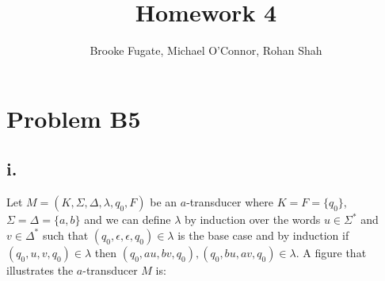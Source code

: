 \documentclass[12pt]{article}
\begin{document}
\pagestyle{plain}
\titleformat{\subsection}[runin]
  {\normalfont\large\bfseries}{\thesubsection}{1em}{}

\title{Homework 4}
\author{Brooke Fugate, Michael O'Connor, Rohan Shah}
\date{}

\maketitle

\section*{Problem B5}
\subsection*{i.}
Let $M = (K, \Sigma, \Delta, \lambda, q_0, F)$ be an $a$-transducer where
$K = F = \{q_0\}$, $\Sigma = \Delta = \{a,b\}$ and we can define $\lambda$
by induction over the words $u\in \Sigma^*$ and $v \in \Delta^*$ such that
$(q_0, \epsilon, \epsilon, q_0) \in \lambda$ is the base case and by induction
if $(q_0, u, v, q_0) \in \lambda$ then $(q_0,au,bv,q_0), (q_0,bu,av,q_0) \in
\lambda$. A figure that illustrates the $a$-transducer $M$ is:
\begin{center}
\end{center}
\end{document}
